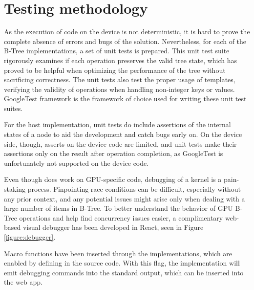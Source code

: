 \section{Testing methodology}

As the execution of code on the device is not deterministic, it is hard to prove the complete absence of errors and bugs of the solution. Nevertheless, for each of the B-Tree implementations, a set of unit tests is prepared. This unit test suite rigorously examines if each operation preserves the valid tree state, which has proved to be helpful when optimizing the performance of the tree without sacrificing correctness. The unit tests also test the proper usage of templates, verifying the validity of operations when handling non-integer keys or values. GoogleTest framework \cite{gtest} is the framework of choice used for writing these unit test suites.

For the host implementation, unit tests do include assertions of the internal states of a node to aid the development and catch bugs early on. On the device side, though, asserts on the device code are limited, and unit tests make their assertions only on the result after operation completion, as GoogleTest is unfortunately not supported on the device code.

Even though  does work on GPU-specific code, debugging of a kernel is a pain-staking process. Pinpointing race conditions can be difficult, especially without any prior context, and any potential issues might arise only when dealing with a large number of items in B-Tree. To better understand the behavior of GPU B-Tree operations and help find concurrency issues easier, a complimentary web-based visual debugger has been developed in React, seen in Figure \cref{figure:debugger}.

Macro functions have been inserted through the implementations, which are enabled by defining  in the source code. With this flag, the implementation will emit debugging commands into the standard output, which can be inserted into the web app.


